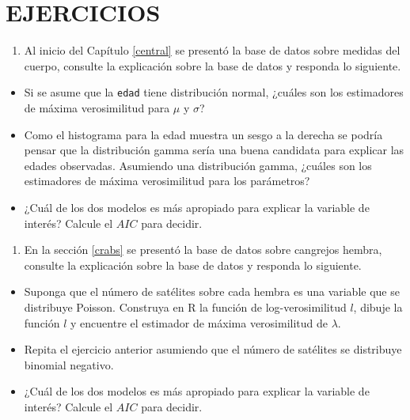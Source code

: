 \documentclass[10pt,]{krantz}
\providecommand{\tightlist}{%
  \setlength{\itemsep}{0pt}\setlength{\parskip}{0pt}}
\let\proglang=\textsf
\begin{document}
\section*{EJERCICIOS}\label{ejercicios-6}


\begin{enumerate}
\def\labelenumi{\arabic{enumi})}
\tightlist
\item
  Al inicio del Capítulo \ref{central} se presentó la base de datos
  sobre medidas del cuerpo, consulte la explicación sobre la base de
  datos y responda lo siguiente.
\end{enumerate}

\begin{itemize}
\tightlist
\item
  Si se asume que la \texttt{edad} tiene distribución normal, ¿cuáles
  son los estimadores de máxima verosimilitud para \(\mu\) y \(\sigma\)?
\item
  Como el histograma para la edad muestra un sesgo a la derecha se
  podría pensar que la distribución gamma sería una buena candidata para
  explicar las edades observadas. Asumiendo una distribución gamma,
  ¿cuáles son los estimadores de máxima verosimilitud para los
  parámetros?
\item
  ¿Cuál de los dos modelos es más apropiado para explicar la variable de
  interés? Calcule el \(AIC\) para decidir.
\end{itemize}

\begin{enumerate}
\def\labelenumi{\arabic{enumi})}
\setcounter{enumi}{1}
\tightlist
\item
  En la sección \ref{crabs} se presentó la base de datos sobre cangrejos
  hembra, consulte la explicación sobre la base de datos y responda lo
  siguiente.
\end{enumerate}

\begin{itemize}
\tightlist
\item
  Suponga que el número de satélites sobre cada hembra es una variable
  que se distribuye Poisson. Construya en \proglang{R} la función de
  log-verosimilitud \(l\), dibuje la función \(l\) y encuentre el
  estimador de máxima verosimilitud de \(\lambda\).
\item
  Repita el ejercicio anterior asumiendo que el número de satélites se
  distribuye binomial negativo.
\item
  ¿Cuál de los dos modelos es más apropiado para explicar la variable de
  interés? Calcule el \(AIC\) para decidir.
\end{itemize}
\end{document}
